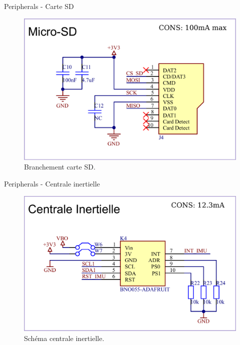 \documentclass{beamer}
\begin{document}
\begin{frame}{Peripherals - Carte SD}
	\begin{figure}[h]
		\centering
		\includegraphics[width=.9\linewidth]{../figures/etude/sch/Carte-SD}
		\caption{Branchement carte SD.}
		\label{fig:carte-sd}
	\end{figure}
\end{frame}

\begin{frame}{Peripherals - Centrale inertielle}
	\begin{figure}[h]
		\centering
		\includegraphics[width=.9\linewidth]{../figures/etude/sch/IMU}
		\caption{Schéma centrale inertielle.}
		\label{fig:imu}
	\end{figure}
\end{frame}
\end{document}
